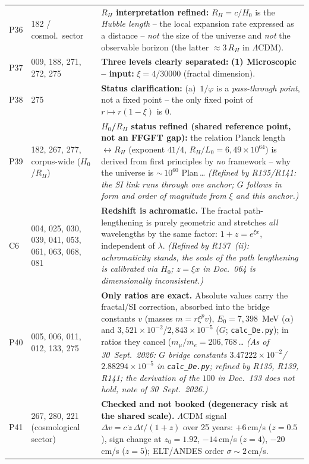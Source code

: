 \begin{longtable}{@{}p{0.9cm}p{3.1cm}p{10.2cm}@{}}
P36 & 182 / cosmol.\ sector & \textbf{$R_H$ interpretation refined:} $R_H = c/H_0$ is the \emph{Hubble length} -- the local expansion rate expressed as a distance -- \emph{not} the size of the universe and \emph{not} the observable horizon (the latter $\approx 3\,R_H$ in $\Lambda$CDM). \\
P37 & 009, 188, 271, 272, 275 & \textbf{Three levels clearly separated:} \newline \textbf{(1) Microscopic -- input:} $\xi = 4/30000$ (fractal dimension). \\
P38 & 275 & \textbf{Status clarification:} (a)~$1/\varphi$ is a \emph{pass-through point}, not a fixed point -- the only fixed point of $r\mapsto r(1-\xi)$ is $0$. \\
P39 & 182, 267, 277, corpus-wide ($H_0$/$R_H$) & \textbf{$H_0$/$R_H$ status refined (shared reference point, not an FFGFT gap):} the relation Planck length$\leftrightarrow R_H$ (exponent $41/4$, $R_H/L_0 = 6{,}49\times10^{64}$) is derived from first principles by \emph{no} framework -- why the universe is $\sim$\,$10^{60}$ Plan\,\ldots{} \emph{(Refined by R135/R141: the SI link runs through one anchor; $G$ follows in form and order of magnitude from $\xi$ and this anchor.)} \\
C6 & 004, 025, 030, 039, 041, 053, 061, 063, 068, 081 & \textbf{Redshift is achromatic.} The fractal path-lengthening is purely geometric and stretches \emph{all} wavelengths by the same factor: $1+z=e^{\xi x}$, independent of $\lambda$. \emph{(Refined by R137~(ii): achromaticity stands, the scale of the path lengthening is calibrated via $H_0$; $z=\xi x$ in Doc.~064 is dimensionally inconsistent.)} \\
P40 & 005, 006, 011, 012, 133, 275 & \textbf{Only ratios are exact.} Absolute values carry the fractal/SI correction, absorbed into the bridge constants $v$ (masses $m=r\xi^p v$), $E_0=7{,}398$~MeV ($\alpha$) and $3{,}521\times10^{-2}$/$2{,}843\times10^{-5}$ ($G$; \texttt{calc\_De.py}); in ratios they cancel ($m_\mu/m_e=206{,}768$\,\ldots{} \emph{(As of 30~Sept.~2026: $G$ bridge constants $3.47222\times10^{-2}$/$2.88294\times10^{-5}$ in \texttt{calc\_De.py}; refined by R135, R139, R141; the derivation of the $100$ in Doc.~133 does not hold, note of 30~Sept.~2026.)} \\
P41 & 267, 280, 221 (cosmological sector) & \textbf{Checked and not booked (degeneracy risk at the shared scale).} $\Lambda$CDM signal $\Delta v=c\,\dot z\,\Delta t/(1+z)$ over 25 years: $+6$\,cm/s ($z{=}0.5$), sign change at $z_0=1.92$, $-14$\,cm/s ($z{=}4$), $-20$\,cm/s ($z{=}5$); ELT/ANDES order $\sigma\sim2$\,cm/s. \\

\end{longtable}
